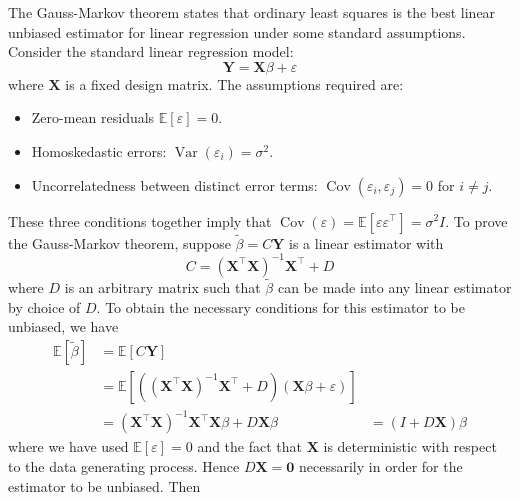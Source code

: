 \documentclass[11pt]{report} %
\begin{document}
The Gauss-Markov theorem states that ordinary least squares is the best linear unbiased estimator for linear regression under some standard assumptions. Consider the standard linear regression model:
\begin{equation}
\mathbf{Y} = \mathbf{X}\beta + \varepsilon
\end{equation}
where $\mathbf{X}$ is a fixed design matrix. The assumptions required are:
\begin{itemize}
\item Zero-mean residuals $\mathbb{E}\left[\varepsilon\right] = 0$.
\item Homoskedastic errors: $\operatorname{Var}\left(\varepsilon_{i}\right) = \sigma^{2}$.
\item Uncorrelatedness between distinct error terms: $\operatorname{Cov}\left(\varepsilon_{i}, \varepsilon_{j}\right) = 0$ for $i \neq j$.
\end{itemize}
These three conditions together imply that $\operatorname{Cov}\left(\varepsilon\right) = \mathbb{E}\left[\varepsilon\varepsilon^{\top}\right] = \sigma^{2}I$. To prove the Gauss-Markov theorem, suppose $\widetilde{\beta} = C\mathbf{Y}$ is a linear estimator with
\begin{equation}
C = \left(\mathbf{X}^{\top}\mathbf{X}\right)^{-1}\mathbf{X}^{\top} + D
\end{equation}
where $D$ is an arbitrary matrix such that $\widetilde{\beta}$ can be made into any linear estimator by choice of $D$. To obtain the necessary conditions for this estimator to be unbiased, we have
\begin{align}
\mathbb{E}\left[\widetilde{\beta}\right] &= \mathbb{E}\left[C\mathbf{Y}\right] \\
&= \mathbb{E}\left[\left(\left(\mathbf{X}^{\top}\mathbf{X}\right)^{-1}\mathbf{X}^{\top} + D\right)\left(\mathbf{X}\beta + \varepsilon\right)\right] \\
&= \left(\mathbf{X}^{\top}\mathbf{X}\right)^{-1}\mathbf{X}^{\top}\mathbf{X}\beta + D\mathbf{X}\beta
&= \left(I + D\mathbf{X}\right)\beta
\end{align}
where we have used $\mathbb{E}\left[\varepsilon\right] = 0$ and the fact that $\mathbf{X}$ is deterministic with respect to the data generating process. Hence $D\mathbf{X} = \mathbf{0}$ necessarily in order for the estimator to be unbiased. Then
\end{document}

